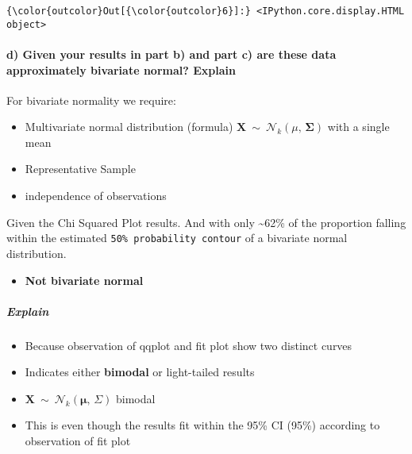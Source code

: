\documentclass[11pt]{article}
\providecommand{\tightlist}{%
      \setlength{\itemsep}{0pt}\setlength{\parskip}{0pt}}
\begin{document}
\begin{Verbatim}[commandchars=\\\{\}]
{\color{outcolor}Out[{\color{outcolor}6}]:} <IPython.core.display.HTML object>
\end{Verbatim}
            
    \hypertarget{d-given-your-results-in-part-b-and-part-c-are-these-data-approximately-bivariate-normal-explain}{%
\paragraph{d) Given your results in part b) and part c) are these data
approximately bivariate normal?
Explain}\label{d-given-your-results-in-part-b-and-part-c-are-these-data-approximately-bivariate-normal-explain}}

    For bivariate normality we require:

\begin{itemize}
\item
  Multivariate normal distribution (formula)
  \(\displaystyle \mathbf {X} \ \sim \ {\mathcal {N}}_{k}({\mu },\,{\boldsymbol {\Sigma }})\)
  with a single mean
\item
  Representative Sample
\item
  independence of observations
\end{itemize}

Given the Chi Squared Plot results. And with only \textasciitilde{}62\%
of the proportion falling within the estimated
\texttt{50\%\ probability\ contour} of a bivariate normal distribution.

\begin{itemize}
\tightlist
\item
  \textbf{Not bivariate normal}
\end{itemize}

\hypertarget{explain}{%
\subparagraph{Explain}\label{explain}}

\begin{itemize}
\tightlist
\item
  Because observation of qqplot and fit plot show two distinct curves
\item
  Indicates either \textbf{bimodal} or light-tailed results
\item
  \(\displaystyle \mathbf {X} \ \sim \ {\mathcal {N}}_{k}({\boldsymbol {\mu }},\,{\Sigma })\)
  bimodal
\item
  This is even though the results fit within the 95\% CI (95\%)
  according to observation of fit plot
\end{itemize}
\end{document}
